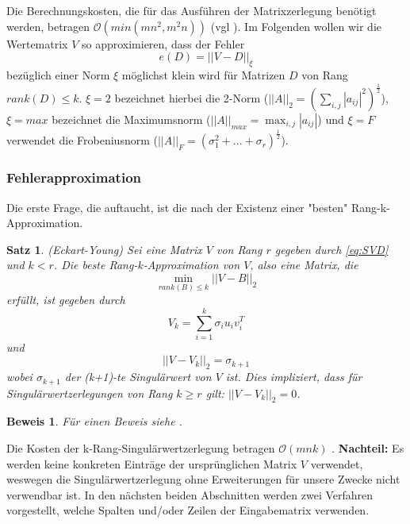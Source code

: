 \documentclass[12pt,a4paper,twoside]{article}
\newtheorem{Satz}{Satz}[section]
\newtheorem{Beweis}{Beweis}
\begin{document}
		Die Berechnungskosten, die für das Ausführen der Matrixzerlegung benötigt werden, betragen $\mathcal{O}(min(mn^2,m^2n))$ (vgl \cite{mahoney2008}).
		\newline 
		\newline
		Im Folgenden wollen wir die Wertematrix $V$ so approximieren, dass der Fehler 
		\begin{equation*}
			e(D)=||V-D||_\xi
		\end{equation*}
		bezüglich einer Norm $\xi$ möglichst klein wird für Matrizen $D$ von Rang $rank(D)\leq k$. $\xi=2$ bezeichnet hierbei die 2-Norm ($||A||_2=\left(\sum_{i,j}|a_{ij}|^2\right)^\frac{1}{2}$), $\xi=max$ bezeichnet die Maximumsnorm ($||A||_{max}=\max_{i,j}|a_{ij}|$) und $\xi=F$ verwendet die Frobeniusnorm ($||A||_F=(\sigma_1^2+...+\sigma_r)^\frac{1}{2}$).
		\newline
		\subsubsection{Fehlerapproximation}
		Die erste Frage, die auftaucht, ist die nach der Existenz einer  "besten" Rang-k-Approximation.
		\begin{Satz}{(Eckart-Young)}
			Sei eine Matrix $V$ von Rang $r$ gegeben durch \ref{eq:SVD} und $k<r$. Die beste Rang-$k$-Approximation 
			von $V$, also eine Matrix, die
			\begin{equation*}
				\min_{rank(B)\leq k}||V-B||_2	
			\end{equation*}		
			erfüllt, ist gegeben durch
			\begin{equation*}
				 V_k=\sum_{i=1}^k\sigma_i u_i v_i^T
			\end{equation*}
			und 
			\begin{equation*}
				||V-V_k||_2=\sigma_{k+1}
			\end{equation*}
			wobei $\sigma_{k+1}$ der (k+1)-te Singulärwert von $V$ ist. Dies impliziert, dass für Singulärwertzerlegungen von Rang $k\geq r$ gilt: $||V-V_k||_2=0$.
		\end{Satz}
		\begin{Beweis}
			Für einen Beweis siehe \cite{Golub2013}.
		\end{Beweis}
		Die Kosten der k-Rang-Singulärwertzerlegung betragen $\mathcal{O}(mnk)$ \citep{Wang2013}. \newline
		\newline
		\textbf{Nachteil:} Es werden keine konkreten Einträge der ursprünglichen Matrix $V$ verwendet, weswegen die Singulärwertzerlegung ohne Erweiterungen für unsere Zwecke nicht verwendbar ist.\newline
		\newline
		In den nächsten beiden Abschnitten werden zwei Verfahren vorgestellt, welche Spalten und/oder Zeilen der 
		Eingabematrix verwenden.
\end{document}
